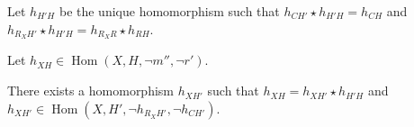 \begin{lemma}
    \label{lem:2_exist}






    Let $h_{H'H}$ be the unique homomorphism such that $h_{CH'} \mathop{\star} h_{H'H} \mathop{=} h_{CH}$ and $h_{R_XH'} \mathop{\star} h_{H'H} \mathop{=} h_{R_XR} \mathop{\star} h_{RH}$.


    Let $h_{XH} \mathop{\in} \operatorname{Hom}(X, H, \lnot m'', \lnot r')$.
    
    There exists a homomorphism $h_{XH'}$ such that $h_{XH} \mathop{=} h_{XH'} \mathop{\star} h_{H'H}$ and $h_{XH'} \mathop{\in} \operatorname{Hom}(X, H', \lnot h_{R_XH'}, \lnot h_{CH'})$.
    

\end{lemma}

